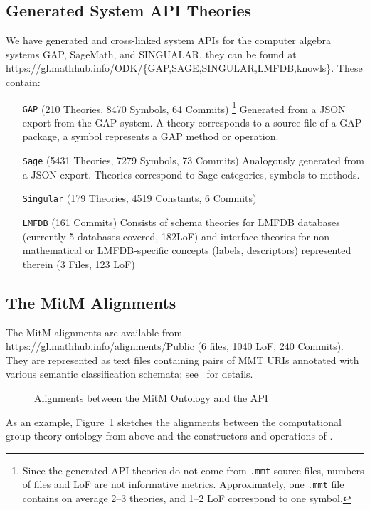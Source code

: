\subsection{Generated System API Theories}\label{sec:sysapis:gentheories}

We have generated and cross-linked system APIs for the computer algebra systems GAP,
SageMath, and SINGUALAR, they can be found at
\url{https://gl.mathhub.info/ODK/{GAP,SAGE,SINGULAR,LMFDB,knowls}}.
These contain:
\begin{itemize}
	\item[\texttt{GAP}] (210 Theories, 8470 Symbols, 64 Commits)
		\footnote{Since the generated API theories do not come from \texttt{.mmt} source files, 
		numbers of files and LoF are not informative metrics. Approximately, one \texttt{.mmt} 
		file contains on average 2--3 theories, and 1--2 LoF correspond to one symbol.} 
		Generated from a JSON export from the GAP system. A theory corresponds to a
		source file of a GAP package, a symbol represents a GAP method or operation.
	\item[\texttt{Sage}] (5431 Theories, 7279 Symbols, 73 Commits) Analogously generated 
		from a JSON export. Theories correspond to Sage categories, symbols to methods.
	\item[\texttt{Singular}] (179 Theories, 4519 Constants, 6 Commits) 
	\item[\texttt{LMFDB}] (161 Commits) Consists of schema theories for LMFDB databases 
		(currently 5 databases covered, 182LoF) and interface theories for non-mathematical or 
		LMFDB-specific concepts (labels, descriptors) represented therein (3 Files, 123 LoF)
\end{itemize}

\subsection{The MitM Alignments}

The MitM alignments are available from \url{https://gl.mathhub.info/alignments/Public} (6
files, 1040 LoF, 240 Commits). They are represented as text files containing pairs of MMT
URIs annotated with various semantic classification schemata;
see~\cite{MueGauKal:cacfms17} for details.
\begin{figure}[ht]\centering
  \caption{Alignments between the MitM Ontology and the \GAP API}\label{fig:cgtontology}
\end{figure}

As an example, Figure~\ref{fig:cgtontology} sketches the alignments between the
computational group theory ontology from above and the constructors and operations of
\GAP.

